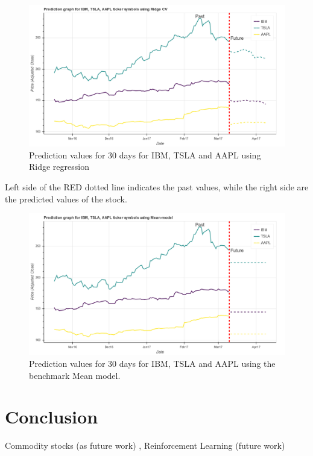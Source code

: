 \documentclass[12pt]{article}
\begin{document}
\begin{itemize}
\begin{figure}[!htbp]
\label{fig:ridge}
\begin{center}
\includegraphics[height=0.5\textheight,width=\textwidth]{ridge.png}
\caption{Prediction values for 30 days for IBM, TSLA and AAPL  using Ridge regression }
\end{center}
\end{figure}

Left side of the RED dotted line indicates the past values, while the right side are the predicted values of the stock. 

\begin{figure}[!htbp]
\label{fig:ridge}
\begin{center}
\includegraphics[height=0.5\textheight,width=\textwidth]{mean.png}
\caption{Prediction values for 30 days for IBM, TSLA and AAPL using the benchmark Mean model.}
\end{center}
\end{figure}

\end{itemize}



\section{Conclusion}
\label{sec:con}

Commodity stocks (as future work) , Reinforcement Learning (future work)


\end{document}

